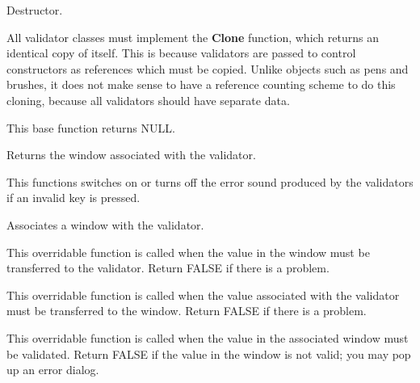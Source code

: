 
Destructor.

\label{wxvalidatorclone}


All validator classes must implement the {\bf Clone} function, which returns
an identical copy of itself. This is because validators are passed to control
constructors as references which must be copied. Unlike objects such as pens
and brushes, it does not make sense to have a reference counting scheme
to do this cloning, because all validators should have separate
data.

This base function returns NULL.

\label{wxvalidatorgetwindow}


Returns the window associated with the validator.



This functions switches on or turns off the error sound produced by the
validators if an invalid key is pressed.

\label{wxvalidatorsetwindow}


Associates a window with the validator.

\label{wxvalidatortransferfromwindow}


This overridable function is called when the value in the window must be
transferred to the validator. Return FALSE if there is a problem.

\label{wxvalidatortransfertowindow}


This overridable function is called when the value associated with the validator must be
transferred to the window. Return FALSE if there is a problem.

\label{wxvalidatorvalidate}


This overridable function is called when the value in the associated window must be validated.
Return FALSE if the value in the window is not valid; you may pop up an error dialog.

